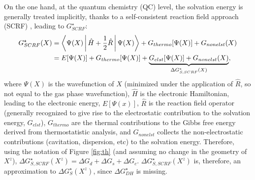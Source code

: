 \documentclass[review,preprint]{elsarticle}
\begin{document}
On the one hand, at the quantum chemistry (QC) level, the solvation energy is generally treated implicitly, thanks to a self-consistent reaction field approach (SCRF) \cite{herbertDielectricContinuumMethods2021}, leading to $G^\star_{SCRF}$: \begin{align}
	G^\star_{SCRF}(X) &= \Braket{\Psi(X)|{\hat{H}+\frac{1}{2}\hat{R}}|\Psi(X)} + G_{thermo}[\Psi(X)] + G_{nonelst}(X) \nonumber\\
	&= E[\Psi(X)] + G_{thermo}[\Psi(X)] + \underbrace{G_{elst}[\Psi(X)] + G_{nonelst}(X)}_{\Delta G^\star_{S,SCRF}(X)}, \label{eq:scrf}
\end{align}
where $\Psi(X)$ is the wavefunction of $X$ (minimized under the application of $\hat R$, so not equal to the gas phase wavefunction), $\hat H$ is the electronic Hamiltonian, leading to the electronic energy, $E[\Psi(x)]$, $\hat R$ is the reaction field operator (generally recognized to give rise to the electrostatic contribution to the solvation energy, $G_{elst}$), $G_{thermo}$ are the thermal contributions to the Gibbs free energy derived from thermostatistic analysis, and $G_{nonelst}$ collects the non-electrostatic contributions (cavitation, dispersion, etc) to the solvation energy. Therefore, using the notation of Figure \ref{fig:th} (and assuming no change in the geometry of $X^z$), $ \Delta G^\star_{S,SCRF}(X^z) = \Delta G_d + \Delta G_s + \Delta G_{c}$. $ \Delta G^\star_{S,SCRF}(X^z)$ is, therefore, an approximation to $\Delta G^\star_S(X^z)$, since $\Delta G^\star_{DH}$ is missing. 
\end{document}
